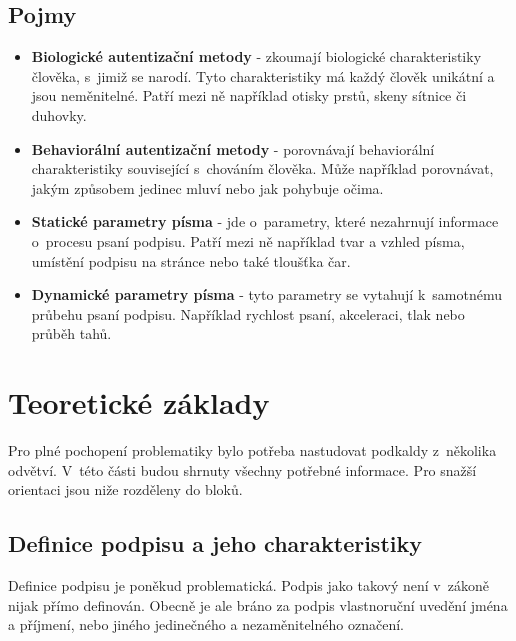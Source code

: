\section{Pojmy}
\label{sec:pojmy}
\begin{itemize}
  \item{\textbf{Biologické autentizační metody} - zkoumají biologické charakteristiky člověka, s~jimiž se narodí. Tyto charakteristiky má každý člověk unikátní a jsou neměnitelné. Patří mezi ně například otisky prstů, skeny sítnice či duhovky.}  
  \item{\textbf{Behaviorální autentizační metody} - porovnávají behaviorální charakteristiky související s~chováním člověka. Může například porovnávat, jakým způsobem jedinec mluví nebo jak pohybuje očima.}
  \item{\textbf{Statické parametry písma} - jde o~parametry, které nezahrnují informace o~procesu psaní podpisu. Patří mezi ně například tvar a vzhled písma, umístění podpisu na stránce nebo také tloušťka čar.}
  \item{\textbf{Dynamické parametry písma} - tyto parametry se vytahují k~samotnému průbehu psaní podpisu. Například rychlost psaní, akceleraci, tlak nebo průběh tahů.}
\end{itemize}


\chapter{Teoretické základy}
Pro plné pochopení problematiky bylo potřeba nastudovat podkaldy z~několika odvětví. 
V~této části budou shrnuty všechny potřebné informace. 
Pro snažší orientaci jsou niže rozděleny do bloků.

\section{Definice podpisu a jeho charakteristiky}
Definice podpisu je poněkud problematická. 
Podpis jako takový není v~zákoně nijak přímo definován. 
Obecně je ale bráno za podpis vlastnoruční uvedění jména a příjmení, nebo jiného jedinečného a nezaměnitelného označení. %

